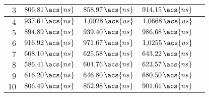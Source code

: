 \begin{longtable}[t]{|r|c|c|c|c|}
    $3$                             & $806{,}81\,\acs{ns}$                            & $ 858{,}97\,\acs{ns}$ & $ 914{,}15\,\acs{ns}$ \\ \hline
    $4$                             & $937{,}61\,\acs{ns}$                            & $ 1{,}0028\,\acs{us}$ & $ 1{,}0668\,\acs{us}$ \\ \hline
    $5$                             & $894{,}89\,\acs{ns}$                            & $ 939{,}40\,\acs{ns}$ & $ 986{,}68\,\acs{ns}$ \\ \hline
    $6$                             & $916{,}92\,\acs{ns}$                            & $ 971{,}67\,\acs{ns}$ & $ 1{,}0255\,\acs{us}$ \\ \hline
    $7$                             & $608{,}10\,\acs{ns}$                            & $ 625{,}58\,\acs{ns}$ & $ 643{,}22\,\acs{ns}$ \\ \hline
    $8$                             & $586{,}41\,\acs{ns}$                            & $ 604{,}76\,\acs{ns}$ & $ 623{,}57\,\acs{ns}$ \\ \hline
    $9$                             & $616{,}20\,\acs{ns}$                            & $ 646{,}80\,\acs{ns}$ & $ 680{,}50\,\acs{ns}$ \\ \hline
    $10$                            & $806{,}49\,\acs{ns}$                            & $ 852{,}98\,\acs{ns}$ & $ 901{,}61\,\acs{ns}$ \\ \hline
\end{longtable}
